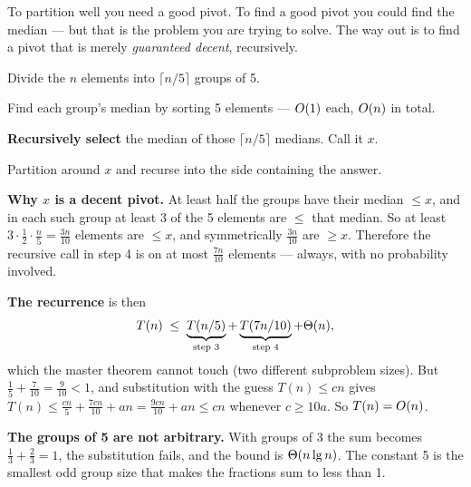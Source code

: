 \begin{conceptbox}
To partition well you need a good pivot. To find a good pivot you could find
the median --- but that is the problem you are trying to solve. The way out is
to find a pivot that is merely \emph{guaranteed decent}, recursively.

\begin{tightnum}
  \item Divide the $n$ elements into $\lceil n/5 \rceil$ groups of 5.
  \item Find each group's median by sorting 5 elements --- $O(1)$ each,
        $O(n)$ in total.
  \item \textbf{Recursively select} the median of those $\lceil n/5 \rceil$
        medians. Call it $x$.
  \item Partition around $x$ and recurse into the side containing the answer.
\end{tightnum}

\smallskip
\textbf{Why $x$ is a decent pivot.} At least half the groups have their median
$\le x$, and in each such group at least 3 of the 5 elements are $\le$ that
median. So at least $3 \cdot \tfrac12 \cdot \tfrac{n}{5} = \tfrac{3n}{10}$
elements are $\le x$, and symmetrically $\tfrac{3n}{10}$ are $\ge x$.
Therefore the recursive call in step 4 is on at most $\tfrac{7n}{10}$
elements --- always, with no probability involved.

\smallskip
\textbf{The recurrence} is then
\[ T(n) \;\le\; \underbrace{T(n/5)}_{\text{step 3}}
             + \underbrace{T(7n/10)}_{\text{step 4}}
             + \Theta(n), \]
which the master theorem cannot touch (two different subproblem sizes). But
$\tfrac15 + \tfrac{7}{10} = \tfrac{9}{10} < 1$, and substitution with the guess
$T(n) \le cn$ gives $T(n) \le \tfrac{c n}{5} + \tfrac{7cn}{10} + an =
\tfrac{9cn}{10} + an \le cn$ whenever $c \ge 10a$. So $T(n) = O(n)$.

\smallskip
\textbf{The groups of 5 are not arbitrary.} With groups of 3 the sum becomes
$\tfrac13 + \tfrac23 = 1$, the substitution fails, and the bound is
$\Theta(n\operatorname{lg} n)$. The constant 5 is the smallest odd group size that makes the
fractions sum to less than 1.
\end{conceptbox}

